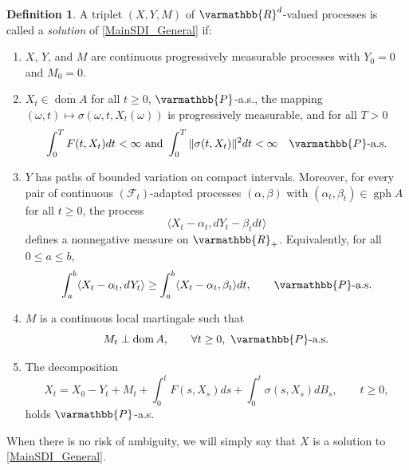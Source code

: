 \documentclass[11pt,reqno]{article}
\let\mathbb=\varmathbb
\newcommand{\1}{\mathds{1}}
\numberwithin{equation}{section}  %
\theoremstyle{plain}
\theoremstyle{definition}
\newtheorem{definition}[theorem]{Definition}
\theoremstyle{remark}
\numberwithin{theorem}{section}
\numberwithin{remark}{section}
\numberwithin{example}{section}
\begin{document}
 \begin{definition}\label{Def_solutionSDI}
A triplet $(X,Y,M)$ of $\mathbb{R}^d$-valued processes is called a \emph{solution} of \eqref{MainSDI_General} if:
\begin{enumerate}[label=\alph*)]
    \item $X$, $Y$, and $M$ are continuous progressively measurable processes with $Y_0=0$ and $M_0=0$.
    
    \item $X_t \in \overline{\operatorname{dom} A}$ for all $t \geq 0$, $\mathbb{P}$-a.s., the mapping $(\omega,t)\mapsto \sigma(\omega, t,X_t(\omega))$ is progressively measurable, and for all $T>0$
    \begin{align*}
     \int_0^T F(t,X_t) dt < \infty \text{ and }  \int_0^T \|\sigma(t,X_t)\|^2 dt < \infty 
       \quad \mathbb{P}\text{-a.s.}
    \end{align*}

    \item $Y$ has paths of bounded variation on compact intervals. Moreover, for every pair of continuous $(\mathcal{F}_t)$-adapted processes $(\alpha,\beta)$ with $(\alpha_t,\beta_t)\in\operatorname{gph} A$ for all $t \geq 0$, the process
    \begin{equation}\label{mono-Yt}
        \langle X_t - \alpha_t, dY_t - \beta_t dt \rangle
    \end{equation}
    defines a nonnegative measure on $\mathbb{R}_+$. Equivalently, for all $0 \leq a \leq b$,
    \begin{equation}\label{measure-prop-solution}
        \int_a^b \langle X_t - \alpha_t, dY_t \rangle 
        \geq \int_a^b \langle X_t - \alpha_t, \beta_t \rangle dt,
        \qquad \mathbb{P}\text{-a.s.}
    \end{equation}

    \item $M$ is a continuous local martingale such that
    \begin{equation}\label{MPerp}
        M_t \perp \operatorname{dom} A,   \qquad \forall t \geq 0,\ \mathbb{P}\text{-a.s.}
    \end{equation}

    \item The decomposition
    \begin{equation}\label{eqn-XY}
        X_t = X_0-Y_t + M_t + \int_0^t F(s,X_s)ds + \int_0^t \sigma(s,X_s) dB_s, 
        \qquad t \geq 0,
    \end{equation}
    holds $\mathbb{P}$-a.s.
\end{enumerate}
When there is no risk of ambiguity, we will simply say that $X$ is a solution to \eqref{MainSDI_General}.
\end{definition}
\end{document}
